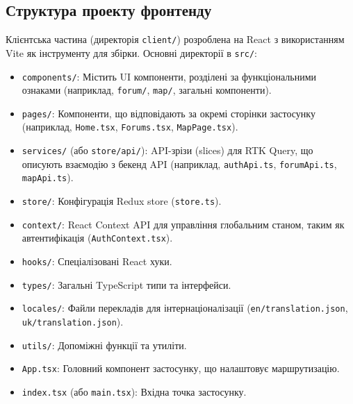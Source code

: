 \subsection{Структура проекту фронтенду}
Клієнтська частина (директорія \texttt{client/}) розроблена на React з використанням Vite як інструменту для збірки. Основні директорії в \texttt{src/}:
\begin{itemize}
    \item \texttt{components/}: Містить UI компоненти, розділені за функціональними ознаками (наприклад, \texttt{forum/}, \texttt{map/}, загальні компоненти).
    \item \texttt{pages/}: Компоненти, що відповідають за окремі сторінки застосунку (наприклад, \texttt{Home.tsx}, \texttt{Forums.tsx}, \texttt{MapPage.tsx}).
    \item \texttt{services/} (або \texttt{store/api/}): API-зрізи (slices) для RTK Query, що описують взаємодію з бекенд API (наприклад, \texttt{authApi.ts}, \texttt{forumApi.ts}, \texttt{mapApi.ts}).
    \item \texttt{store/}: Конфігурація Redux store (\texttt{store.ts}).
    \item \texttt{context/}: React Context API для управління глобальним станом, таким як автентифікація (\texttt{AuthContext.tsx}).
    \item \texttt{hooks/}: Спеціалізовані React хуки.
    \item \texttt{types/}: Загальні TypeScript типи та інтерфейси.
    \item \texttt{locales/}: Файли перекладів для інтернаціоналізації (\texttt{en/translation.json}, \texttt{uk/translation.json}).
    \item \texttt{utils/}: Допоміжні функції та утиліти.
    \item \texttt{App.tsx}: Головний компонент застосунку, що налаштовує маршрутизацію.
    \item \texttt{index.tsx} (або \texttt{main.tsx}): Вхідна точка застосунку.
\end{itemize}

